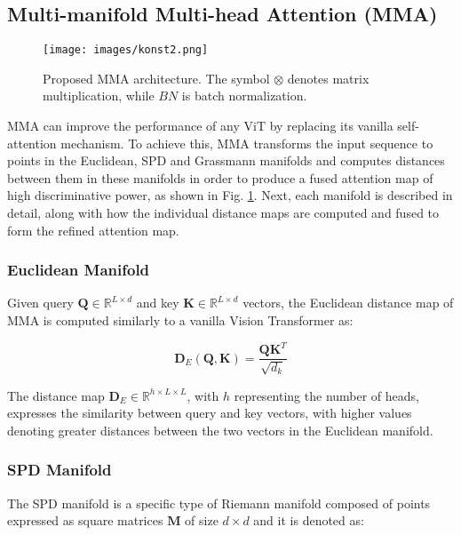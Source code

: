 \documentclass[10pt,twocolumn,letterpaper]{article}
\begin{document}
\subsection{Multi-manifold Multi-head Attention (MMA)}

\begin{figure}[t]
  \centering
  \texttt{[image: images/konst2.png]}
  \caption{Proposed MMA architecture. The symbol $\otimes$ denotes matrix multiplication, while $BN$ is batch normalization.}
  \label{fig:mma}
\end{figure}

MMA can improve the performance of any ViT by replacing its vanilla self-attention mechanism. To achieve this, MMA transforms the input sequence to points in the Euclidean, SPD and Grassmann manifolds and computes distances between them in these manifolds in order to produce a fused attention map of high discriminative power, as shown in Fig. \ref{fig:mma}. Next, each manifold is described in detail, along with how the individual distance maps are computed and fused to form the refined attention map.

\subsubsection{Euclidean Manifold}

Given query $\textbf{Q} \in \mathbb{R}^{L \times d}$ and key $\textbf{K} \in \mathbb{R}^{L \times d}$ vectors, the Euclidean distance map of MMA is computed similarly to a vanilla Vision Transformer as:

\begin{equation}
    \textbf{D}_{E}(\textbf{Q},\textbf{K}) = \frac{\textbf{Q}\textbf{K}^T}{\sqrt{d_k}}
    \label{eq:emp}
\end{equation}

The distance map $\textbf{D}_{E} \in \mathbb{R}^{h\times L \times L}$, with $h$ representing the number of heads, expresses the similarity between query and key vectors, with higher values denoting greater distances between the two vectors in the Euclidean manifold.

\subsubsection{SPD Manifold}

The SPD manifold is a specific type of Riemann manifold composed of points expressed as square matrices $\textbf{M}$ of size $d\times d$ and it is denoted as:
\end{document}
